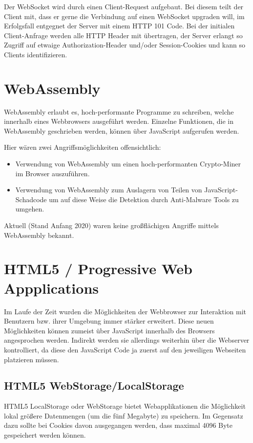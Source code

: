 Der WebSocket wird durch einen Client-Request aufgebaut. Bei diesem teilt der Client mit, dass er gerne die Verbindung auf einen WebSocket upgraden will, im Erfolgsfall entgegnet der Server mit einem HTTP 101 Code. Bei der initialen Client-Anfrage werden alle HTTP Header mit übertragen, der Server erlangt so Zugriff auf etwaige Authorization-Header und/oder Session-Cookies und kann so Clients identifizieren.

\section{WebAssembly}

WebAssembly erlaubt es, hoch-performante Programme zu schreiben, welche innerhalb eines Webbrowsers ausgeführt werden. Einzelne Funktionen, die in WebAssembly geschrieben werden, können über JavaScript aufgerufen werden.

Hier wären zwei Angriffsmöglichkeiten offensichtlich:

\begin{itemize}
	\item Verwendung von WebAssembly um einen hoch-performanten Crypto-Miner im Browser auszuführen.
	\item Verwendung von WebAssembly zum Auslagern von Teilen von JavaScript-Schadcode um auf diese Weise die Detektion durch Anti-Malware Tools zu umgehen.
\end{itemize}

Aktuell (Stand Anfang 2020) waren keine großflächigen Angriffe mittels WebAssembly bekannt.

\section{HTML5 / Progressive Web Appplications}

Im Laufe der Zeit wurden die Möglichkeiten der Webbrowser zur Interaktion mit Benutzern bzw. ihrer Umgebung immer stärker erweitert. Diese neuen Möglichkeiten können zumeist über JavaScript innerhalb des Browsers angesprochen werden. Indirekt werden sie allerdings weiterhin über die Webserver kontrolliert, da diese den JavaScript Code ja zuerst auf den jeweiligen Webseiten platzieren müssen.

\subsection{HTML5 WebStorage/LocalStorage}

HTML5 LocalStorage oder WebStorage bietet Webapplikationen die Möglichkeit lokal größere Datenmengen (um die fünf Megabyte) zu speichern. Im Gegensatz dazu sollte bei Cookies davon ausgegangen werden, dass maximal 4096 Byte gespeichert werden können.

